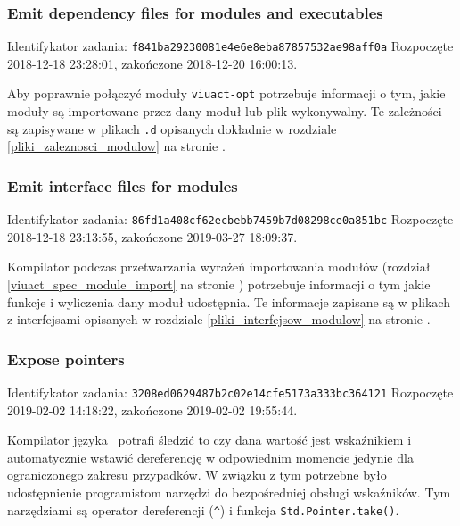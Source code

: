 \subsubsection{Emit dependency files for modules and executables}

Identifykator zadania: \texttt{f841ba29230081e4e6e8eba87857532ae98aff0a}
\newline
Rozpoczęte 2018-12-18 23:28:01, zakończone 2018-12-20 16:00:13.
\newline

Aby poprawnie połączyć moduły \texttt{viuact-opt} potrzebuje informacji o tym,
jakie moduły są importowane przez dany moduł lub plik wykonywalny. Te zależności
są zapisywane w plikach \texttt{.d} opisanych dokładnie w rozdziale
\ref{pliki_zaleznosci_modulow} na stronie \pageref{pliki_zaleznosci_modulow}.

\subsubsection{Emit interface files for modules}

Identifykator zadania: \texttt{86fd1a408cf62ecbebb7459b7d08298ce0a851bc}
\newline
Rozpoczęte 2018-12-18 23:13:55, zakończone 2019-03-27 18:09:37.
\newline

Kompilator podczas przetwarzania wyrażeń importowania modułów (rozdział
\ref{viuact_spec_module_import} na stronie \pageref{viuact_spec_module_import})
potrzebuje informacji o tym jakie funkcje i wyliczenia dany moduł udostępnia. Te
informacje zapisane są w plikach z interfejsami opisanych w rozdziale
\ref{pliki_interfejsow_modulow} na stronie \pageref{pliki_interfejsow_modulow}.

\subsubsection{Expose pointers}

Identifykator zadania: \texttt{3208ed0629487b2c02e14cfe5173a333bc364121}
\newline
Rozpoczęte 2019-02-02 14:18:22, zakończone 2019-02-02 19:55:44.
\newline

Kompilator języka \ViuAct\ potrafi śledzić to czy dana wartość jest wskaźnikiem
i automatycznie wstawić dereferencję w odpowiednim momencie jedynie dla
ograniczonego zakresu przypadków. W związku z tym potrzebne było udostępnienie
programistom narzędzi do bezpośredniej obsługi wskaźników. Tym narzędziami są
operator dereferencji (\texttt{\^}) i funkcja \texttt{Std.Pointer.take()}.

